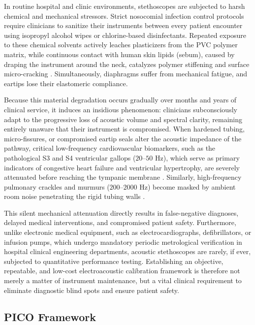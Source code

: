 In routine hospital and clinic environments, stethoscopes are subjected to harsh chemical and mechanical stressors. Strict nosocomial infection control protocols require clinicians to sanitize their instruments between every patient encounter using isopropyl alcohol wipes or chlorine-based disinfectants. Repeated exposure to these chemical solvents actively leaches plasticizers from the PVC polymer matrix, while continuous contact with human skin lipids (sebum), caused by draping the instrument around the neck, catalyzes polymer stiffening and surface micro-cracking \cite{josh2012temperature, zhang2024review}. Simultaneously, diaphragms suffer from mechanical fatigue, and eartips lose their elastomeric compliance.

Because this material degradation occurs gradually over months and years of clinical service, it induces an insidious phenomenon: clinicians subconsciously adapt to the progressive loss of acoustic volume and spectral clarity, remaining entirely unaware that their instrument is compromised. When hardened tubing, micro-fissures, or compromised eartip seals alter the acoustic impedance of the pathway, critical low-frequency cardiovascular biomarkers, such as the pathological S3 and S4 ventricular gallops ($20\text{--}50\text{ Hz}$), which serve as primary indicators of congestive heart failure and ventricular hypertrophy, are severely attenuated before reaching the tympanic membrane \cite{ertel1966stethoscope}. Similarly, high-frequency pulmonary crackles and murmurs ($200\text{--}2000\text{ Hz}$) become masked by ambient room noise penetrating the rigid tubing walls \cite{leng2015electronic}.

This silent mechanical attenuation directly results in false-negative diagnoses, delayed medical interventions, and compromised patient safety. Furthermore, unlike electronic medical equipment, such as electrocardiographs, defibrillators, or infusion pumps, which undergo mandatory periodic metrological verification in hospital clinical engineering departments, acoustic stethoscopes are rarely, if ever, subjected to quantitative performance testing. Establishing an objective, repeatable, and low-cost electroacoustic calibration framework is therefore not merely a matter of instrument maintenance, but a vital clinical requirement to eliminate diagnostic blind spots and ensure patient safety.

\subsection{PICO Framework}

